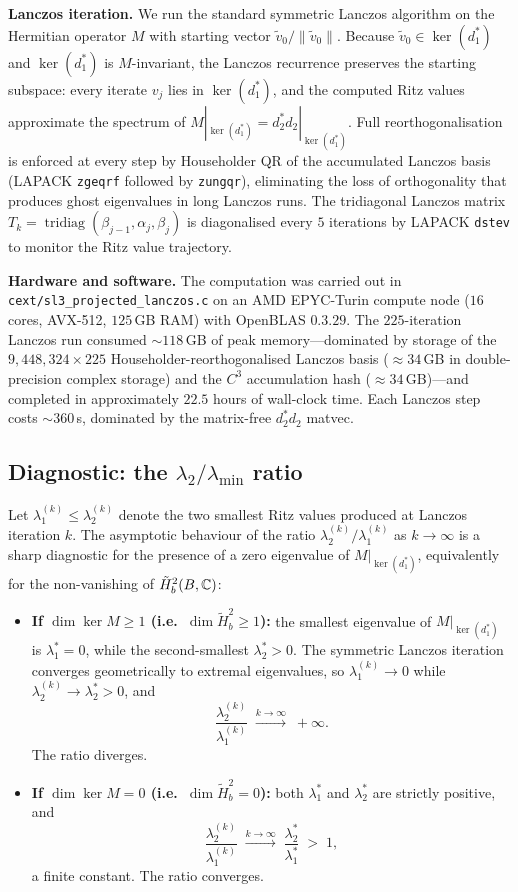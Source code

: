 \medskip\noindent\textbf{Lanczos iteration.} We run the standard symmetric Lanczos algorithm on the Hermitian operator $M$ with starting vector $\tilde{v}_0 / \|\tilde{v}_0\|$. Because $\tilde{v}_0 \in \ker(d_1^*)$ and $\ker(d_1^*)$ is $M$-invariant, the Lanczos recurrence preserves the starting subspace: every iterate $v_j$ lies in $\ker(d_1^*)$, and the computed Ritz values approximate the spectrum of $M|_{\ker(d_1^*)} = d_2^* d_2|_{\ker(d_1^*)}$. Full reorthogonalisation is enforced at every step by Householder QR of the accumulated Lanczos basis (LAPACK \texttt{zgeqrf} followed by \texttt{zungqr}), eliminating the loss of orthogonality that produces ghost eigenvalues in long Lanczos runs. The tridiagonal Lanczos matrix $T_k = \operatorname{tridiag}(\beta_{j-1}, \alpha_j, \beta_j)$ is diagonalised every $5$ iterations by LAPACK \texttt{dstev} to monitor the Ritz value trajectory.

\medskip\noindent\textbf{Hardware and software.} The computation was carried out in \texttt{cext/sl3\_projected\_lanczos.c} on an AMD EPYC-Turin compute node ($16$ cores, AVX-512, $125$\,GB RAM) with OpenBLAS $0.3.29$. The $225$-iteration Lanczos run consumed $\sim 118$\,GB of peak memory---dominated by storage of the $9{,}448{,}324 \times 225$ Householder-reorthogonalised Lanczos basis ($\approx 34$\,GB in double-precision complex storage) and the $C^3$ accumulation hash ($\approx 34$\,GB)---and completed in approximately $22.5$ hours of wall-clock time. Each Lanczos step costs $\sim 360$\,s, dominated by the matrix-free $d_2^* d_2$ matvec.

\subsection{Diagnostic: the $\lambda_2 / \lambda_{\min}$ ratio}
\label{sec:h2b_diagnostic}

Let $\lambda_1^{(k)} \leq \lambda_2^{(k)}$ denote the two smallest Ritz values produced at Lanczos iteration $k$. The asymptotic behaviour of the ratio $\lambda_2^{(k)} / \lambda_1^{(k)}$ as $k \to \infty$ is a sharp diagnostic for the presence of a zero eigenvalue of $M|_{\ker(d_1^*)}$, equivalently for the non-vanishing of $\tilde{H}^2_b(B, \mathbb{C})$:

\begin{itemize}
\item \textbf{If $\dim \ker M \geq 1$ (i.e.\ $\dim \tilde{H}^2_b \geq 1$):} the smallest eigenvalue of $M|_{\ker(d_1^*)}$ is $\lambda_1^* = 0$, while the second-smallest $\lambda_2^* > 0$. The symmetric Lanczos iteration converges geometrically to extremal eigenvalues, so $\lambda_1^{(k)} \to 0$ while $\lambda_2^{(k)} \to \lambda_2^* > 0$, and
\[
\frac{\lambda_2^{(k)}}{\lambda_1^{(k)}} \;\xrightarrow{k \to \infty}\; +\infty.
\]
The ratio diverges.

\item \textbf{If $\dim \ker M = 0$ (i.e.\ $\dim \tilde{H}^2_b = 0$):} both $\lambda_1^*$ and $\lambda_2^*$ are strictly positive, and
\[
\frac{\lambda_2^{(k)}}{\lambda_1^{(k)}} \;\xrightarrow{k \to \infty}\; \frac{\lambda_2^*}{\lambda_1^*} \;>\; 1,
\]
a finite constant. The ratio converges.
\end{itemize}

